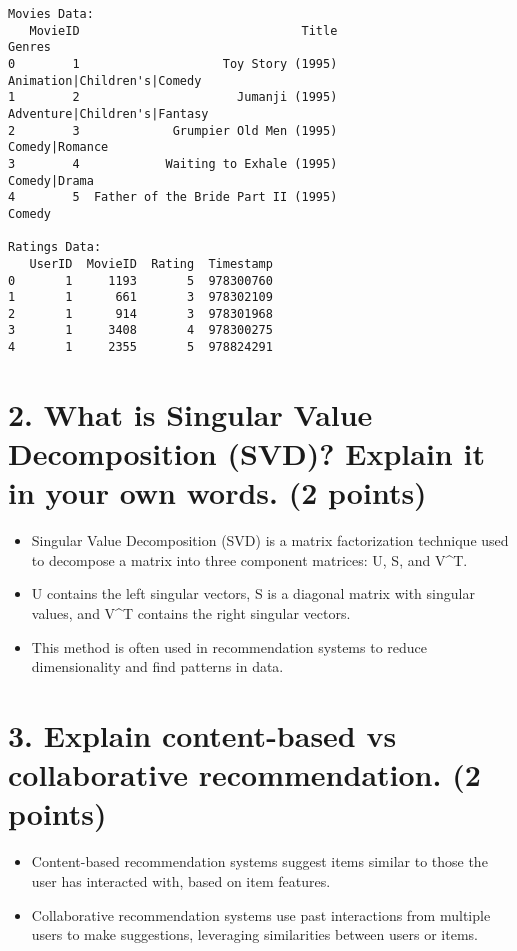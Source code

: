 \documentclass[11pt]{article}
\providecommand{\tightlist}{%
      \setlength{\itemsep}{0pt}\setlength{\parskip}{0pt}}
\begin{document}
    \begin{Verbatim}[commandchars=\\\{\}]
Movies Data:
   MovieID                               Title                        Genres
0        1                    Toy Story (1995)   Animation|Children's|Comedy
1        2                      Jumanji (1995)  Adventure|Children's|Fantasy
2        3             Grumpier Old Men (1995)                Comedy|Romance
3        4            Waiting to Exhale (1995)                  Comedy|Drama
4        5  Father of the Bride Part II (1995)                        Comedy

Ratings Data:
   UserID  MovieID  Rating  Timestamp
0       1     1193       5  978300760
1       1      661       3  978302109
2       1      914       3  978301968
3       1     3408       4  978300275
4       1     2355       5  978824291
    \end{Verbatim}

    \section{2. What is Singular Value Decomposition (SVD)? Explain it in
your own words. (2
points)}\label{what-is-singular-value-decomposition-svd-explain-it-in-your-own-words.-2-points}

\begin{itemize}
\tightlist
\item
  Singular Value Decomposition (SVD) is a matrix factorization technique
  used to decompose a matrix into three component matrices: U, S, and
  V\^{}T.
\item
  U contains the left singular vectors, S is a diagonal matrix with
  singular values, and V\^{}T contains the right singular vectors.
\item
  This method is often used in recommendation systems to reduce
  dimensionality and find patterns in data.
\end{itemize}

    \section{3. Explain content-based vs collaborative recommendation. (2
points)}\label{explain-content-based-vs-collaborative-recommendation.-2-points}

\begin{itemize}
\tightlist
\item
  Content-based recommendation systems suggest items similar to those
  the user has interacted with, based on item features.
\item
  Collaborative recommendation systems use past interactions from
  multiple users to make suggestions, leveraging similarities between
  users or items.
\end{itemize}
\end{document}
